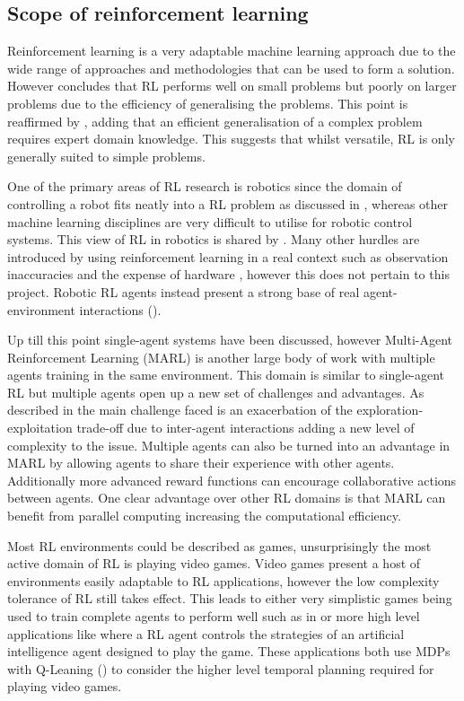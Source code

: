 \documentclass[10pt,journal]{IEEEtran}
\begin{document}
\subsection{Scope of reinforcement learning}
Reinforcement learning is a very adaptable machine learning approach due to the wide range of approaches and methodologies that can be used to form a solution. However \cite{Kaelbling} concludes that RL performs well on small problems but poorly on larger problems due to the efficiency of generalising the problems. This point is reaffirmed by \cite{Wirth}, adding that an efficient generalisation of a complex problem requires expert domain knowledge. This suggests that whilst versatile, RL is only generally suited to simple problems.

One of the primary areas of RL research is robotics since the domain of controlling a robot fits neatly into a RL problem as discussed in \cite{Kober}, whereas other machine learning disciplines are very difficult to utilise for robotic control systems. This view of RL in robotics is shared by \cite{Smart}. Many other hurdles are introduced by using reinforcement learning in a real context such as observation inaccuracies and the expense of hardware \cite{Kober}, however this does not pertain to this project. Robotic RL agents instead present a strong base of real agent-environment interactions (\cite{Kober}).

Up till this point single-agent systems have been discussed, however Multi-Agent Reinforcement Learning (MARL) is another large body of work with multiple agents training in the same environment. This domain is similar to single-agent RL but multiple agents open up a new set of challenges and advantages. As described in \cite{Busoniu} the main challenge faced is an exacerbation of the exploration-exploitation trade-off due to inter-agent interactions adding a new level of complexity to the issue. Multiple agents can also be turned into an advantage in MARL by allowing agents to share their experience with other agents. Additionally more advanced reward functions can encourage collaborative actions between agents. One clear advantage over other RL domains is that MARL can benefit from parallel computing increasing the computational efficiency.

Most RL environments could be described as games, unsurprisingly the most active domain of RL is playing video games. Video games present a host of environments easily adaptable to RL applications, however the low complexity tolerance of RL still takes effect. This leads to either very simplistic games being used to train complete agents to perform well such as in \cite{Bellemare} or more high level applications like \cite{Amato} where a RL agent controls the strategies of an artificial intelligence agent designed to play the game. These applications both use MDPs with Q-Leaning (\cite{Watkins92}) to consider the higher level temporal planning required for playing video games.
\end{document}
